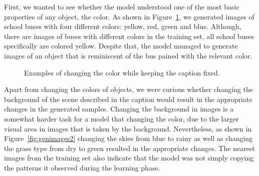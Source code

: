 \documentclass{article} %
\begin{document}
First, we wanted to see whether the model understood one of the most basic properties of any object, the color. As shown in Figure~\ref{fig:genimages1}, we generated images of school buses with four different colors: yellow, red, green and blue. Although, there are images of buses with different colors in the training set, all school buses specifically are colored yellow. Despite that, the model managed to generate images of an object that is reminiscent of the bus pained with the relevant color.

\begin{figure}[!h]
\captionsetup[subfigure]{labelformat=empty}
\begin{center}
\quad
%
\quad
%
\quad
%
\quad
%
\end{center}
\caption{Examples of changing the color while keeping the caption fixed.}
\label{fig:genimages1}
\vspace{-0.3cm}
\end{figure}

Apart from changing the colors of objects, we were curious whether changing the background of the scene described in the caption would result in the appropriate changes in the generated samples. Changing the background in images is a somewhat harder task for a model that changing the color, due to the larger visual area in images that is taken by the background. Nevertheless, as shown in Figure~\ref{fig:genimages2} changing the skies from blue to rainy as well as changing the grass type from dry to green resulted in the appropriate changes. The nearest images from the training set also indicate that the model was not simply copying the patterns it observed during the learning phase.
\end{document}

